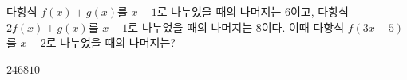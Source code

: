 다항식 $f(x)+g(x)$를 $x-1$로 나누었을 때의 나머지는 $6$이고, 다항식 $2f(x)+g(x)$를 $x-1$로 나누었을 때의 나머지는 $8$이다. 이때 다항식 $f(3x-5)$를 $x-2$로 나누었을 때의 나머지는?
\begin{choices32}{$2$}{$4$}{$6$}{$8$}{$10$}\end{choices32}
